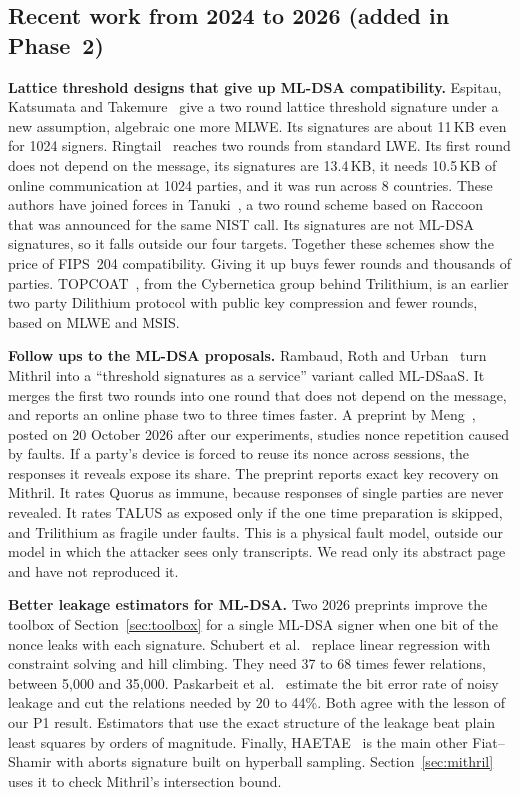 \documentclass[10pt,conference,a4paper]{IEEEtran}
\begin{document}
\subsection{Recent work from 2024 to 2026 (added in Phase~2)}\label{sec:recent}
\textbf{Lattice threshold designs that give up ML-DSA compatibility.} Espitau, Katsumata and Takemure~\cite{aommlwe} give a
two round lattice threshold signature under a new assumption, algebraic one more MLWE. Its signatures are about 11\,KB even
for 1024 signers. Ringtail~\cite{ringtail} reaches two rounds from standard LWE. Its first round does not depend on the
message, its signatures are 13.4\,KB, it needs 10.5\,KB of online communication at 1024 parties, and it was run across 8
countries. These authors have joined forces in Tanuki~\cite{tanuki}, a two round scheme based on Raccoon that was announced
for the same NIST call. Its signatures are not ML-DSA signatures, so it falls outside our four targets. Together these
schemes show the price of FIPS~204 compatibility. Giving it up buys fewer rounds and thousands of parties.
TOPCOAT~\cite{topcoat}, from the Cybernetica group behind Trilithium, is an earlier two party Dilithium protocol with
public key compression and fewer rounds, based on MLWE and MSIS.

\textbf{Follow ups to the ML-DSA proposals.} Rambaud, Roth and Urban~\cite{mldsaas} turn Mithril into a ``threshold
signatures as a service'' variant called ML-DSaaS. It merges the first two rounds into one round that does not depend on
the message, and reports an online phase two to three times faster. A preprint by Meng~\cite{meng}, posted on 20 October
2026 after our experiments, studies nonce repetition caused by faults. If a party's device is forced to reuse its nonce
across sessions, the responses it reveals expose its share. The preprint reports exact key recovery on Mithril. It rates
Quorus as immune, because responses of single parties are never revealed. It rates TALUS as exposed only if the one time
preparation is skipped, and Trilithium as fragile under faults. This is a physical fault model, outside our model in which
the attacker sees only transcripts. We read only its abstract page and have not reproduced it.

\textbf{Better leakage estimators for ML-DSA.} Two 2026 preprints improve the toolbox of Section~\ref{sec:toolbox} for a
single ML-DSA signer when one bit of the nonce leaks with each signature. Schubert et al.~\cite{descent} replace linear
regression with constraint solving and hill climbing. They need 37 to 68 times fewer relations, between 5{,}000 and
35{,}000. Paskarbeit et al.~\cite{noisyleak} estimate the bit error rate of noisy leakage and cut the relations needed by
20 to 44\%. Both agree with the lesson of our P1 result. Estimators that use the exact structure of the leakage beat plain
least squares by orders of magnitude. Finally, HAETAE~\cite{haetae} is the main other Fiat--Shamir with aborts signature
built on hyperball sampling. Section~\ref{sec:mithril} uses it to check Mithril's intersection bound.
\end{document}
